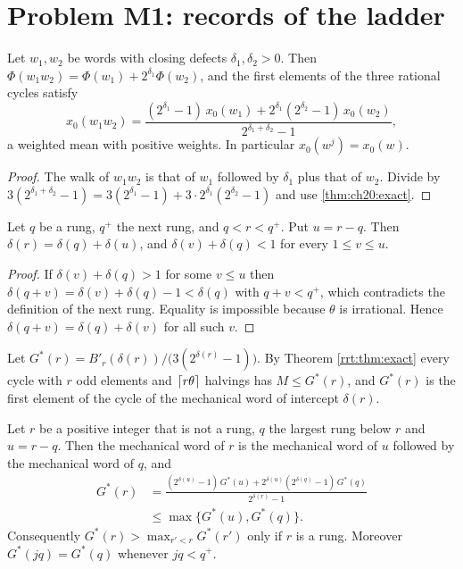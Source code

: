 \section{Problem M1: records of the ladder}

\begin{lemma}\label{rrt:lem:concat}
Let $w_1,w_2$ be words with closing defects $\delta_1,\delta_2>0$. Then $\Phi(w_1w_2)=\Phi(w_1)+2^{\delta_1}\Phi(w_2)$, and the first elements of the three rational cycles satisfy
\[
x_0(w_1w_2)=\frac{(2^{\delta_1}-1)\,x_0(w_1)+2^{\delta_1}(2^{\delta_2}-1)\,x_0(w_2)}{2^{\delta_1+\delta_2}-1},
\]
a weighted mean with positive weights. In particular $x_0(w^j)=x_0(w)$.
\end{lemma}

\begin{proof}
The walk of $w_1w_2$ is that of $w_1$ followed by $\delta_1$ plus that of $w_2$. Divide by $3(2^{\delta_1+\delta_2}-1)=3(2^{\delta_1}-1)+3\cdot2^{\delta_1}(2^{\delta_2}-1)$ and use \cref{thm:ch20:exact}.
\end{proof}

\begin{lemma}\label{rrt:lem:add}
Let $q$ be a rung, $q^+$ the next rung, and $q<r<q^+$. Put $u=r-q$. Then $\delta(r)=\delta(q)+\delta(u)$, and $\delta(v)+\delta(q)<1$ for every $1\le v\le u$.
\end{lemma}

\begin{proof}
If $\delta(v)+\delta(q)>1$ for some $v\le u$ then $\delta(q+v)=\delta(v)+\delta(q)-1<\delta(q)$ with $q+v<q^+$, which contradicts the definition of the next rung. Equality is impossible because $\theta$ is irrational. Hence $\delta(q+v)=\delta(q)+\delta(v)$ for all such $v$.
\end{proof}

Let $G^*(r)=B'_r(\delta(r))/\bigl(3(2^{\delta(r)}-1)\bigr)$. By Theorem \ref{rrt:thm:exact} every cycle with $r$ odd elements and $\lceil r\theta\rceil$ halvings has $M\le G^*(r)$, and $G^*(r)$ is the first element of the cycle of the mechanical word of intercept $\delta(r)$.

\begin{theorem}\label{rrt:thm:records}
Let $r$ be a positive integer that is not a rung, $q$ the largest rung below $r$ and $u=r-q$. Then the mechanical word of $r$ is the mechanical word of $u$ followed by the mechanical word of $q$, and
\begin{align*}
G^*(r)&=\frac{(2^{\delta(u)}-1)\,G^*(u)+2^{\delta(u)}(2^{\delta(q)}-1)\,G^*(q)}{2^{\delta(r)}-1}\\
&\le\max\{G^*(u),G^*(q)\}.
\end{align*}
Consequently $G^*(r)>\max_{r'<r}G^*(r')$ only if $r$ is a rung. Moreover $G^*(jq)=G^*(q)$ whenever $jq<q^+$.
\end{theorem}

